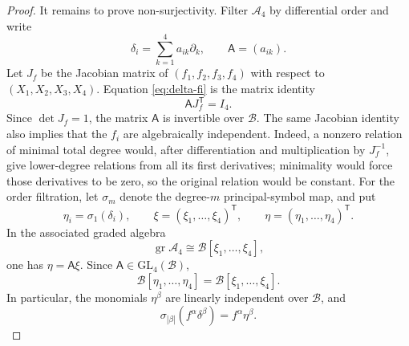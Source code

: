 \documentclass[11pt]{article}
\newcommand{\Bcal}{\mathcal B}
\newcommand{\Weyl}{\mathcal A}
\newcommand{\gr}{\operatorname{gr}}
\theoremstyle{remark}
\begin{document}
\begin{proof}
It remains to prove non-surjectivity.  Filter \(\Weyl_4\) by differential
order and write
\begin{equation}\label{eq:delta-coefficient-matrix}
  \delta_i=\sum_{k=1}^4 a_{ik}\partial_k,
  \qquad
  \mathsf A=(a_{ik}).
\end{equation}
Let \(J_f\) be the Jacobian matrix of \((f_1,f_2,f_3,f_4)\) with respect to
\((X_1,X_2,X_3,X_4)\).  Equation \eqref{eq:delta-fi} is the matrix identity
\begin{equation}\label{eq:A-J-identity}
  \mathsf A J_f^{\mathsf T}=I_4.
\end{equation}
Since \(\det J_f=1\), the matrix \(\mathsf A\) is invertible over \(\Bcal\).
The same Jacobian identity also implies that the \(f_i\) are algebraically
independent.  Indeed, a nonzero relation of minimal total degree would, after
differentiation and multiplication by \(J_f^{-1}\), give lower-degree
relations from all its first derivatives; minimality would force those
derivatives to be zero, so the original relation would be constant.  For the
order filtration, let \(\sigma_m\) denote the degree-\(m\) principal-symbol map,
and put
\[
  \eta_i=\sigma_1(\delta_i),
  \qquad
  \xi=(\xi_1,\dots,\xi_4)^{\mathsf T},
  \qquad
  \eta=(\eta_1,\dots,\eta_4)^{\mathsf T}.
\]
In the associated graded algebra
\begin{equation}\label{eq:gr-Weyl}
  \gr\Weyl_4\cong\Bcal[\xi_1,\dots,\xi_4],
\end{equation}
one has \(\eta=\mathsf A\xi\).  Since \(\mathsf A\in\mathrm{GL}_4(\Bcal)\),
\[
  \Bcal[\eta_1,\dots,\eta_4]
  =\Bcal[\xi_1,\dots,\xi_4].
\]
In particular, the monomials \(\eta^\beta\) are linearly independent over
\(\Bcal\), and
\begin{equation}\label{eq:principal-symbol-monomial}
  \sigma_{|\beta|}\!\left(f^\alpha\delta^\beta\right)
  =f^\alpha\eta^\beta.
\end{equation}


\end{proof}
\end{document}
